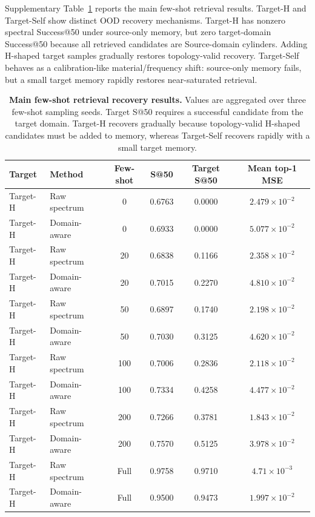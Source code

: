 \documentclass[final,1p,times]{elsarticle}
\begin{document}
Supplementary Table~\ref{tab:si_phase4_fewshot_main} reports the main few-shot retrieval results. Target-H and Target-Self show distinct OOD recovery mechanisms. Target-H has nonzero spectral Success@50 under source-only memory, but zero target-domain Success@50 because all retrieved candidates are Source-domain cylinders. Adding H-shaped target samples gradually restores topology-valid recovery. Target-Self behaves as a calibration-like material/frequency shift: source-only memory fails, but a small target memory rapidly restores near-saturated retrieval.

\begin{table}[htbp!]
\centering
\caption{\textbf{Main few-shot retrieval recovery results.}
Values are aggregated over three few-shot sampling seeds. Target S@50 requires a successful candidate from the target domain. Target-H recovers gradually because topology-valid H-shaped candidates must be added to memory, whereas Target-Self recovers rapidly with a small target memory.}
\label{tab:si_phase4_fewshot_main}
\footnotesize
\setlength{\tabcolsep}{4.2pt}
\renewcommand{\arraystretch}{1.12}
\begin{tabular}{llcccc}
\toprule
Target & Method & Few-shot & S@50 & Target S@50 & Mean top-1 MSE \\
\midrule
Target-H & Raw spectrum & 0 & 0.6763 & 0.0000 & $2.479\times10^{-2}$ \\
Target-H & Domain-aware & 0 & 0.6933 & 0.0000 & $5.077\times10^{-2}$ \\
Target-H & Raw spectrum & 20 & 0.6838 & 0.1166 & $2.358\times10^{-2}$ \\
Target-H & Domain-aware & 20 & 0.7015 & 0.2270 & $4.810\times10^{-2}$ \\
Target-H & Raw spectrum & 50 & 0.6897 & 0.1740 & $2.198\times10^{-2}$ \\
Target-H & Domain-aware & 50 & 0.7030 & 0.3125 & $4.620\times10^{-2}$ \\
Target-H & Raw spectrum & 100 & 0.7006 & 0.2836 & $2.118\times10^{-2}$ \\
Target-H & Domain-aware & 100 & 0.7334 & 0.4258 & $4.477\times10^{-2}$ \\
Target-H & Raw spectrum & 200 & 0.7266 & 0.3781 & $1.843\times10^{-2}$ \\
Target-H & Domain-aware & 200 & 0.7570 & 0.5125 & $3.978\times10^{-2}$ \\
Target-H & Raw spectrum & Full & 0.9758 & 0.9710 & $4.71\times10^{-3}$ \\
Target-H & Domain-aware & Full & 0.9500 & 0.9473 & $1.997\times10^{-2}$ \\

\end{tabular}
\end{table}
\end{document}
